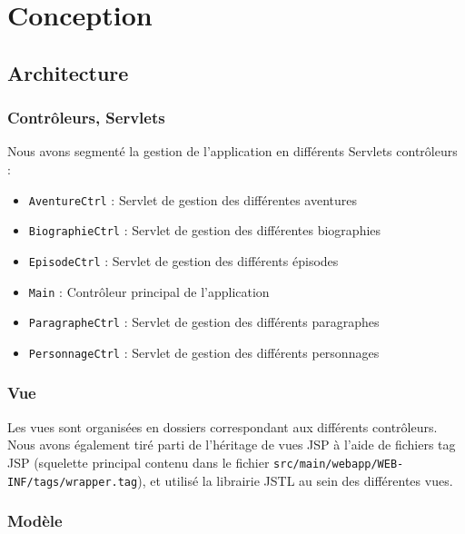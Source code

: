 \documentclass[a4paper, 11pt, titlepage]{article}
\begin{document}
\section {Conception}

\subsection {Architecture}

\subsubsection {Contrôleurs, Servlets}

Nous avons segmenté la gestion de l'application en différents Servlets contrôleurs :
\begin{itemize}
\item
\lstinline!AventureCtrl! : Servlet de gestion des différentes aventures

\item
\lstinline!BiographieCtrl! : Servlet de gestion des différentes biographies

\item
\lstinline!EpisodeCtrl! : Servlet de gestion des différents épisodes

\item
\lstinline!Main! : Contrôleur principal de l'application

\item
\lstinline!ParagrapheCtrl! : Servlet de gestion des différents paragraphes

\item
\lstinline!PersonnageCtrl! : Servlet de gestion des différents personnages
\end{itemize}


\subsubsection {Vue}

Les vues sont organisées en dossiers correspondant aux différents contrôleurs. Nous avons également tiré parti de l'héritage de vues JSP à l'aide de fichiers tag JSP (squelette principal contenu dans le fichier \lstinline!src/main/webapp/WEB-INF/tags/wrapper.tag!), et utilisé la librairie JSTL au sein des différentes vues.


\subsubsection {Modèle}
\end{document}
